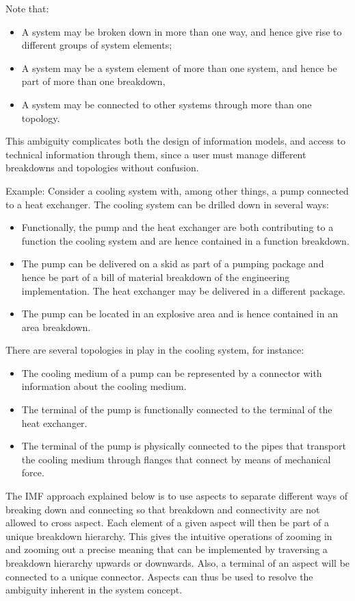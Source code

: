 \documentclass[../main.tex]{subfiles}
\begin{document}
Note that:
\begin{itemize}
    \item  A system may be broken down in more than one way, and hence give rise to different groups of system elements;
    \item A system  may be a system element of more than one system, and hence be part of more than one breakdown, 
    \item A system may be connected to other systems through more than one topology.
\end{itemize}
This ambiguity complicates both the design of information models, and access to technical information through them, since a user must manage different breakdowns and topologies without confusion.

Example: Consider a cooling system with, among other things, a pump connected to a heat exchanger.  The cooling system can be drilled down in several ways:
\begin{itemize}
    \item Functionally, the pump and the heat exchanger  are both contributing to a  function the cooling system and are hence contained in a function breakdown. 
    \item The pump can be delivered on a skid as part of a pumping package and hence be part of a bill of material breakdown of the engineering implementation. The heat exchanger may be delivered in a different package. 
    \item The pump can be located in an explosive area and is hence contained in an area breakdown. 
\end{itemize}
There are several topologies in play in the cooling system, for instance:  
\begin{itemize}
    \item The cooling medium of a pump  can be  represented by a connector with information about the cooling medium.
    \item The terminal of the pump is functionally connected to the terminal of
the heat exchanger. 
\item The terminal of the pump is  physically connected to the pipes that transport the cooling medium
through flanges that connect by means of mechanical force. 
\end{itemize}


The IMF approach explained below is to use aspects to separate  different ways of  breaking down and connecting so that breakdown and connectivity  are not allowed to cross aspect. Each
element of a given aspect will then be part of a unique breakdown
hierarchy. This gives the intuitive operations of zooming in and
zooming out a precise meaning that can be implemented by traversing a
breakdown hierarchy upwards or downwards.
Also, a terminal of an aspect will be connected to a unique connector. 
Aspects can thus be used to resolve the ambiguity inherent in the system concept.  
\end{document}
